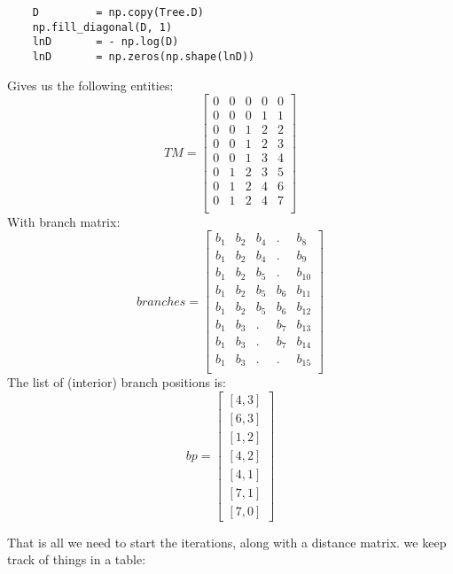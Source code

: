 \documentclass[11pt]{article}
\begin{document}
\begin{tiny}
\begin{verbatim}
    D         = np.copy(Tree.D)
    np.fill_diagonal(D, 1)
    lnD       = - np.log(D)
    lnD       = np.zeros(np.shape(lnD))
\end{verbatim}
Gives us the following entities:
\begin{equation*}
TM = \left[\begin{array}{ccccc}
0 & 0 & 0 & 0 & 0 \\
0 & 0 & 0 & 1 & 1 \\
0 & 0 & 1 & 2 & 2 \\
0 & 0 & 1 & 2 & 3 \\
0 & 0 & 1 & 3 & 4 \\
0 & 1 & 2 & 3 & 5 \\
0 & 1 & 2 & 4 & 6 \\
0 & 1 & 2 & 4 & 7 \\ 
\end{array}\right]
\end{equation*}
With branch matrix:
\begin{equation*}
branches = \left[\begin{array}{ccccc}
b_1 & b_2 & b_4 & .   & b_8 \\
b_1 & b_2 & b_4 & .   & b_9 \\
b_1 & b_2 & b_5 & .   & b_{10} \\
b_1 & b_2 & b_5 & b_6 & b_{11} \\
b_1 & b_2 & b_5 & b_6 & b_{12} \\
b_1 & b_3 & .   & b_7 & b_{13} \\
b_1 & b_3 & .   & b_7 & b_{14} \\
b_1 & b_3 & .   & .   & b_{15} \\
\end{array}\right]
\end{equation*}
The list of (interior) branch positions is:
\begin{equation*}
bp = \left[\begin{array}{c}
\left[4,3\right] \\
\left[6,3\right] \\
\left[1,2\right] \\
\left[4,2\right] \\
\left[4,1\right] \\
\left[7,1\right] \\
\left[7,0\right]
 \end{array}\right]
\end{equation*}

That is all we need to start the iterations, along with a distance matrix. we keep track of things in a table:


\end{tiny}
\end{document}
